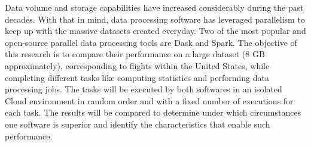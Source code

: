 \documentclass[11pt, oneside]{book}
\begin{document}
\noindent Data volume and storage capabilities have increased considerably during the past decades. With that in mind, data processing software has leveraged parallelism to keep up with the massive datasets created everyday. Two of the most popular and open-source parallel data processing tools are Dask and Spark. The objective of this research is to compare their performance on a large dataset (8 GB
approximately), corresponding to flights within the United States, while completing different tasks
like computing statistics and performing data processing jobs. The tasks will be executed by both
softwares in an isolated Cloud environment in random order and with a fixed number of executions
for each task. The results will be compared to determine under which circumstances one software is
superior and identify the characteristics that enable such performance.

\pagestyle{plain}

\noindent 


\tableofcontents


\listoftables

\listoffigures


\mainmatter %

\pagestyle{plain}















\end{document}
